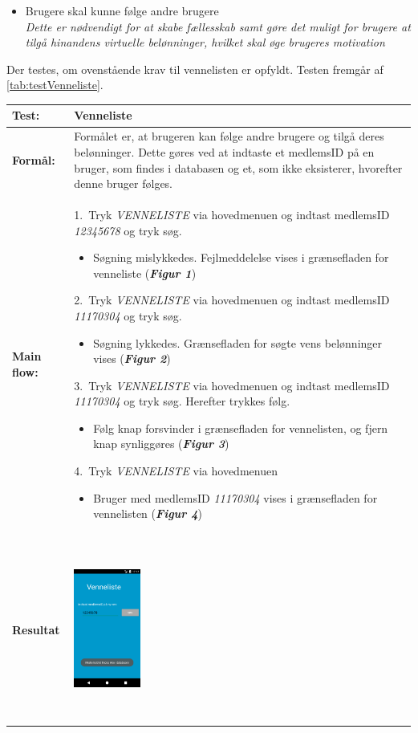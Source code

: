 \begin{itemize}
\item Brugere skal kunne følge andre brugere
\\
\textit{Dette er nødvendigt for at skabe fællesskab samt gøre det muligt for brugere at tilgå hinandens virtuelle belønninger, hvilket skal øge brugeres motivation}
\end{itemize}

\noindent
Der testes, om ovenstående krav til vennelisten er opfyldt. Testen fremgår af \autoref{tab:testVenneliste}.

  \begin{longtable}{ | l | p{13cm} |} \hline
    \textbf{Test:} & Venneliste \\ \hline
  \textbf{Formål:} & Formålet er, at brugeren kan følge andre brugere og tilgå deres belønninger. Dette gøres ved at indtaste et medlemsID på en bruger, som findes i databasen og et, som ikke eksisterer, hvorefter denne bruger følges.
 \\ \hline
 	\textbf{Main flow:} & 1.~Tryk \textit{VENNELISTE} via hovedmenuen og indtast medlemsID \textit{12345678} og tryk søg.  
 	\begin{itemize}
 	\item Søgning mislykkedes. Fejlmeddelelse vises i grænsefladen for venneliste (\textbf{\textit{Figur 1}})
 	\end{itemize}	
 	2.~Tryk \textit{VENNELISTE} via hovedmenuen og indtast medlemsID \textit{11170304} og tryk søg.
 	\begin{itemize}
 	\item Søgning lykkedes. Grænsefladen for søgte vens belønninger vises (\textbf{\textit{Figur 2}})
	\end{itemize}
  3.~Tryk \textit{VENNELISTE} via hovedmenuen og indtast medlemsID \textit{11170304} og tryk søg. Herefter trykkes følg.
  \begin{itemize}
  \item  Følg knap forsvinder i grænsefladen for vennelisten, og fjern knap synliggøres (\textbf{\textit{Figur 3}})
  \end{itemize}
  4.~Tryk \textit{VENNELISTE} via hovedmenuen
  \begin{itemize}
  \item Bruger med medlemsID \textit{11170304} vises i grænsefladen for vennelisten (\textbf{\textit{Figur 4}})
  \end{itemize} \hspace{0.2mm}\\ \hline
\textbf{Resultat} & \hspace{0.3mm} \raisebox{-\totalheight}    {\includegraphics[width=0.20\textwidth, height=60mm]{figures/test/vennelisteny}} 

\end{longtable}
